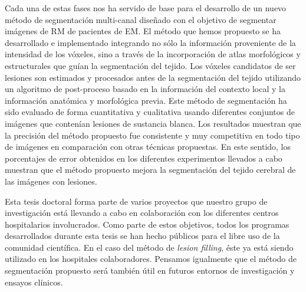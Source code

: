 Cada una de estas fases nos ha servido de base para el desarrollo de un nuevo método de segmentación multi-canal diseñado con el objetivo de segmentar imágenes de RM de pacientes de EM.  El método que hemos propuesto se ha desarrollado e implementado integrando no sólo la información proveniente de la intensidad de los vóxeles, sino a través de la incorporación de atlas morfológicos y estructurales que guían la segmentación del tejido. Los vóxeles candidatos de ser lesiones son estimados y procesados antes de la segmentación del tejido utilizando un algoritmo de post-proceso basado en la información del contexto local y la información anatómica y morfológica previa. Este método de segmentación ha sido evaluado de forma cuantitativa y cualitativa usando diferentes conjuntos de imágenes que contenían lesiones de sustancia blanca. Los resultados muestran que la precisión del método propuesto fue consistente y muy competitiva en todo tipo de imágenes en comparación con otras técnicas propuestas. En este sentido, los porcentajes de error obtenidos en los diferentes experimentos llevados a cabo muestran que el método propuesto mejora la segmentación del tejido cerebral de las imágenes con lesiones.

Esta tesis doctoral forma parte de varios proyectos que nuestro grupo de investigación está llevando a cabo en colaboración con los diferentes centros hospitalarios involucrados. Como parte de estos objetivos, todos los programas desarrollados durante esta tesis se han hecho públicos para el libre uso de la comunidad científica. En el caso del método de \textit{lesion filling}, éste ya está siendo utilizado en los hospitales colaboradores. Pensamos igualmente que el método de segmentación propuesto será también útil en futuros entornos de investigación y ensayos clínicos.

 
